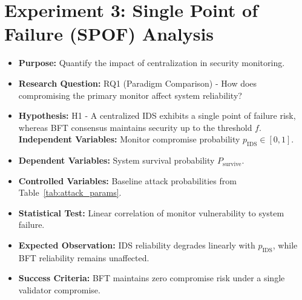 \documentclass[12pt, oneside, a4paper]{report}
\theoremstyle{definition}
\theoremstyle{remark}
\begin{document}
\section{Experiment 3: Single Point of Failure (SPOF) Analysis}
\label{sec:ed:e3}
\begin{itemize}
  \item \textbf{Purpose:} Quantify the impact of centralization in security monitoring.
  \item \textbf{Research Question:} RQ1 (Paradigm Comparison) - How does compromising the primary monitor affect system reliability?
  \item \textbf{Hypothesis:} H1 - A centralized IDS exhibits a single point of failure risk, whereas BFT consensus maintains security up to the threshold $f$.
  \textbf{Independent Variables:} Monitor compromise probability $p_{\mathrm{IDS}} \in [0, 1]$.
  \item \textbf{Dependent Variables:} System survival probability $P_{\mathrm{survive}}$.
  \item \textbf{Controlled Variables:} Baseline attack probabilities from Table~\ref{tab:attack_params}.
  \item \textbf{Statistical Test:} Linear correlation of monitor vulnerability to system failure.
  \item \textbf{Expected Observation:} IDS reliability degrades linearly with $p_{\mathrm{IDS}}$, while BFT reliability remains unaffected.
  \item \textbf{Success Criteria:} BFT maintains zero compromise risk under a single validator compromise.
\end{itemize}
\end{document}
